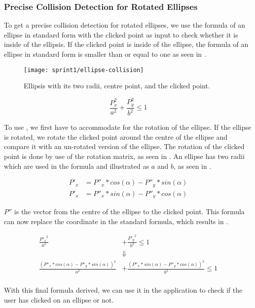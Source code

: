 \subsubsection{Precise Collision Detection for Rotated Ellipses}
To get a precise collision detection for rotated ellipses, we use the formula of an ellipse in standard form with the clicked point as input to check whether it is inside of the ellipsis.
If the clicked point is inside of the ellipse, the formula of an ellipse in standard form is smaller than or equal to one as seen in .

\begin{figure}[h]
	\centering
	\texttt{[image: sprint1/ellipse-collision]}
	\caption{Ellipsis with its two radii, centre point, and the clicked point.}
	\label{figure:ellipse-collision}
\end{figure}

\begin{equation}\label{eq:standard-equation}
	\frac{P_x^2}{a^2} + \frac{P_y^2}{b^2} \leq 1
\end{equation}

To use , we first have to accommodate for the rotation of the ellipse.
If the ellipse is rotated, we rotate the clicked point around the centre of the ellipse and compare it with an un-rotated version of the ellipse.
The rotation of the clicked point is done by use of the rotation matrix, as seen in .
An ellipse has two radii which are used in the formula and illustrated as $a$ and $b$, as seen in .

\begin{equation}\label{eq:ellipses-rotation-matrix}
\begin{aligned}
	P'_x &= P''_x * cos(\alpha) - P''_y * sin(\alpha)\\
	P'_x &= P''_x * sin(\alpha) - P''_y * cos(\alpha)
\end{aligned}
\end{equation}

$P''$ is the vector from the centre of the ellipse to the clicked point.
This formula can now replace the coordinate in the standard formula, which results in .

\begin{equation}\label{eq:final-ellipses-equation}
\begin{aligned}
	\frac{{P'_x}^2}{a^2} &+ \frac{{P'_y}^2}{b^2} \leq 1	\\
	&\Downarrow\\
	\frac{ (P''_x * cos(\alpha) - P''_y * sin(\alpha))^2}{a^2} &+ \frac{(P''_x * sin(\alpha) - P''_y * cos(\alpha))^2}{b^2} \leq 1\\
\end{aligned}
\end{equation}

With this final formula derived, we can use it in the application to check if the user has clicked on an ellipse or not.